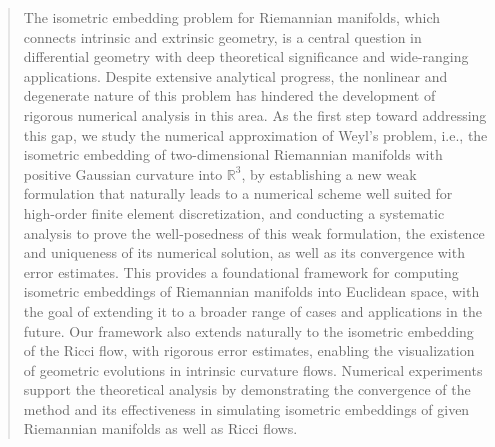 \documentclass[11pt,a4paper,oneside,reqno]{amsart}
\theoremstyle{definition}
\theoremstyle{plain}
\numberwithin{theorem}{section}
\numberwithin{proposition}{section}
\numberwithin{lemma}{section}
\numberwithin{equation}{section}
\begin{document}
\begin{abstract}
The isometric embedding problem for Riemannian manifolds, which connects intrinsic and extrinsic geometry, is a central question in differential geometry with deep theoretical significance and wide-ranging applications. Despite extensive analytical progress, the nonlinear and degenerate nature of this problem has hindered the development of rigorous numerical analysis in this area. As the first step toward addressing this gap, we study the numerical approximation of Weyl’s problem, i.e., the isometric embedding of two-dimensional Riemannian manifolds with positive Gaussian curvature into $\mathbb{R}^3$, by establishing a new weak formulation that naturally leads to a numerical scheme well suited for high-order finite element discretization, and conducting a systematic analysis to prove the well-posedness of this weak formulation, the existence and uniqueness of its numerical solution, as well as its convergence with error estimates. This provides a foundational framework for computing isometric embeddings of Riemannian manifolds into Euclidean space, with the goal of extending it to a broader range of cases and applications in the future. Our framework also extends naturally to the isometric embedding of the Ricci flow, with rigorous error estimates, enabling the visualization of geometric evolutions in intrinsic curvature flows. Numerical experiments support the theoretical analysis by demonstrating the convergence of the method and its effectiveness in simulating isometric embeddings of given Riemannian manifolds as well as Ricci flows.\\



\end{abstract}
\end{document}
